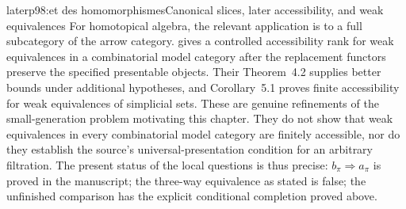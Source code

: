 \begin{dcomment}{later}{p98:et des homomorphismes}{Canonical slices, later accessibility, and weak equivalences}
For homotopical algebra, the relevant application is to a full subcategory of the arrow category. \citet[Proposition~2.2 in author version~2; Proposition~2.3 in the journal]{RaptisRosicky2015} gives a controlled accessibility rank for weak equivalences in a combinatorial model category after the replacement functors preserve the specified presentable objects. Their Theorem~4.2 supplies better bounds under additional hypotheses, and Corollary~5.1 proves finite accessibility for weak equivalences of simplicial sets. These are genuine refinements of the small-generation problem motivating this chapter. They do not show that weak equivalences in every combinatorial model category are finitely accessible, nor do they establish the source's universal-presentation condition for an arbitrary filtration. The present status of the local questions is thus precise: $b_\pi\Rightarrow a_\pi$ is proved in the manuscript; the three-way equivalence as stated is false; the unfinished comparison has the explicit conditional completion proved above.
\end{dcomment}
